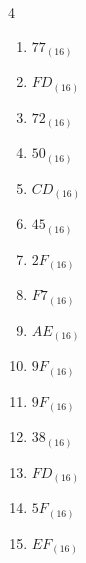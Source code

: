 \begin{multicols}{4}
\begin{enumerate}
  \item $77_{(16)}$

        \phantom{$=119$}

  \item $FD_{(16)}$

        \phantom{$=253$}

  \item $72_{(16)}$

        \phantom{$=114$}

  \item $50_{(16)}$

        \phantom{$=80$}

  \item $CD_{(16)}$

        \phantom{$=205$}

  \item $45_{(16)}$

        \phantom{$=69$}

  \item $2F_{(16)}$

        \phantom{$=47$}

  \item $F7_{(16)}$

        \phantom{$=247$}

  \item $AE_{(16)}$

        \phantom{$=174$}

  \item $9F_{(16)}$

        \phantom{$=159$}

  \item $9F_{(16)}$

        \phantom{$=159$}

  \item $38_{(16)}$

        \phantom{$=56$}

\columnbreak %

\resetques

  \item $FD_{(16)}$

        \phantom{$=253$}

  \item $5F_{(16)}$

        \phantom{$=95$}

  \item $EF_{(16)}$

        \phantom{$=239$}


\end{enumerate}
\end{multicols}
